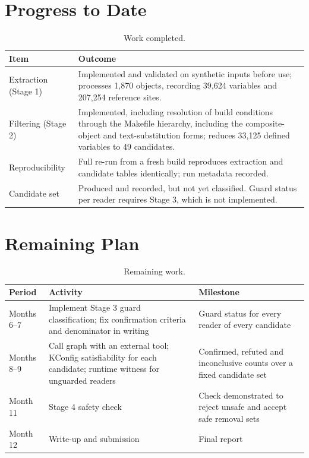\documentclass[12pt, a4paper, oneside]{book}
\begin{document}
\section{Progress to Date}

\begin{table}[H]
\centering
\caption{Work completed.}
\renewcommand{\arraystretch}{1.4}
\begin{tabularx}{\textwidth}{L{4.6cm} L{8.2cm}}
\toprule
\textbf{Item} & \textbf{Outcome} \\
\midrule
Extraction (Stage 1) &
  Implemented and validated on synthetic inputs before use; processes 1,870
  objects, recording 39,624 variables and 207,254 reference sites. \\
\addlinespace
Filtering (Stage 2) &
  Implemented, including resolution of build conditions through the Makefile
  hierarchy, including the composite-object and text-substitution forms;
  reduces 33,125 defined variables to 49 candidates. \\
\addlinespace
Reproducibility &
  Full re-run from a fresh build reproduces extraction and candidate tables
  identically; run metadata recorded. \\
\addlinespace
Candidate set &
  Produced and recorded, but not yet classified. Guard status per reader
  requires Stage 3, which is not implemented. \\
\bottomrule
\end{tabularx}
\end{table}

\section{Remaining Plan}

\begin{table}[H]
\centering
\caption{Remaining work.}
\renewcommand{\arraystretch}{1.5}
\begin{tabularx}{\textwidth}{C{1.6cm} L{5.4cm} L{5.8cm}}
\toprule
\textbf{Period} & \textbf{Activity} & \textbf{Milestone} \\
\midrule
Months 6--7 &
  Implement Stage 3 guard
  classification; fix confirmation criteria and denominator in writing &
  Guard status for every reader of every candidate \\
\addlinespace
Months 8--9 &
  Call graph with an external tool; KConfig satisfiability for each candidate;
  runtime witness for unguarded readers &
  Confirmed, refuted and inconclusive counts over a fixed candidate set \\
\addlinespace
Month 11 &
  Stage 4 safety check &
  Check demonstrated to reject unsafe and accept safe removal sets \\
\addlinespace
Month 12 &
  Write-up and submission &
  Final report \\
\bottomrule
\end{tabularx}
\end{table}
\end{document}
